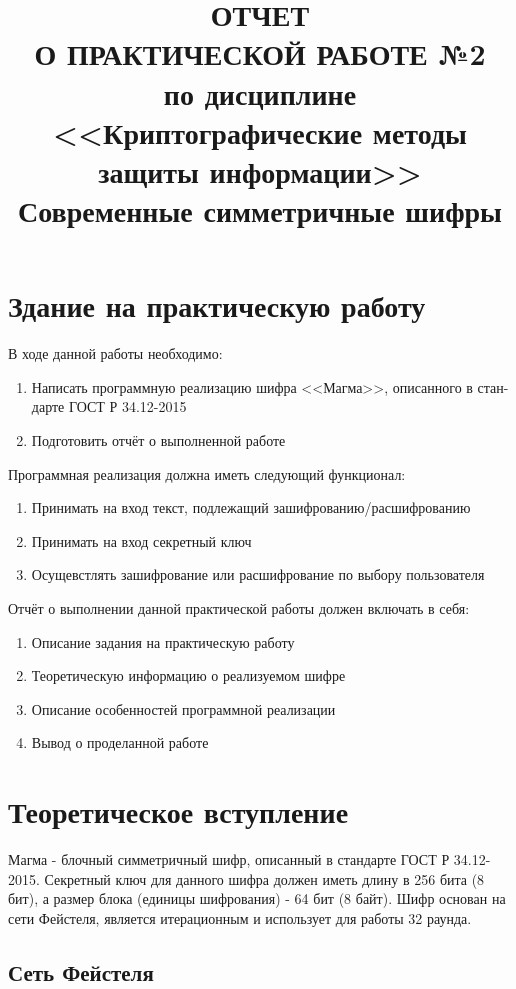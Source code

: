 \documentclass[a4paper]{article}
\title{
  ОТЧЕТ \\
  О ПРАКТИЧЕСКОЙ РАБОТЕ №2 \\
  по дисциплине <<Криптографические методы защиты информации>> \\
  Современные симметричные шифры
}
\begin{document}
  \templatedtitlepage
  
  \toc

  \section{Здание на практическую работу}
  В ходе данной работы необходимо:
  \begin{enumerate}
    \item Написать программную реализацию шифра <<Магма>>, описанного в стан-дарте ГОСТ Р 34.12-2015
    \item Подготовить отчёт о выполненной работе
  \end{enumerate}

  Программная реализация должна иметь следующий функционал:
  \begin{enumerate}
    \item Принимать на вход текст, подлежащий зашифрованию/расшифрованию
    \item Принимать на вход секретный ключ
    \item Осущевстлять зашифрование или расшифрование по выбору пользователя
  \end{enumerate}

  Отчёт о выполнении данной практической работы должен включать в себя:
  \begin{enumerate}
    \item Описание задания на практическую работу
    \item Теоретическую информацию о реализуемом шифре
    \item Описание особенностей программной реализации
    \item Вывод о проделанной работе
  \end{enumerate}

  \newpage
  \section{Теоретическое вступление}

  Магма - блочный симметричный шифр, описанный в стандарте ГОСТ Р 34.12-2015.
  Секретный ключ для данного шифра должен иметь длину в 256 бита (8 бит), а размер
  блока (единицы шифрования) - 64 бит (8 байт). Шифр основан на сети Фейстеля,
  является итерационным и использует для работы 32 раунда.

  \subsection{Сеть Фейстеля}
\end{document}
